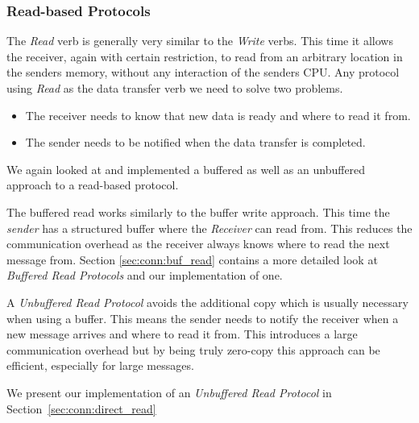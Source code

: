 \subsubsection{Read-based Protocols}
The \emph{Read} verb is generally very similar to the \emph{Write} verbs. This time it allows the receiver, again with certain
restriction, to read from an arbitrary location in the senders memory, without any interaction of the senders CPU. Any protocol
using \emph{Read} as the data transfer verb we need to solve two problems.

\begin{itemize}
  \item The receiver needs to know that new data is ready and where to read it from.
  \item The sender needs to be notified when the data transfer is completed.
\end{itemize}

We again looked at and implemented a buffered as well as an unbuffered approach to a read-based protocol. 


The buffered read works similarly to the buffer write approach. This time the \emph{sender} has a structured buffer where the 
\emph{Receiver} can read from. This reduces the communication overhead as the receiver always knows where to read the next 
message from. Section \ref{sec:conn:buf_read} contains a more detailed look at \emph{Buffered Read Protocols} and our 
implementation of one.

A \emph{Unbuffered Read Protocol} avoids the additional copy which is usually necessary when using a buffer. This means the 
sender needs to notify the receiver when a new message arrives and where to read it from.  This introduces a large
communication overhead but by being truly zero-copy this approach can be efficient, especially for large messages.

We present our implementation of an \emph{Unbuffered Read Protocol} in Section~\ref{sec:conn:direct_read}



